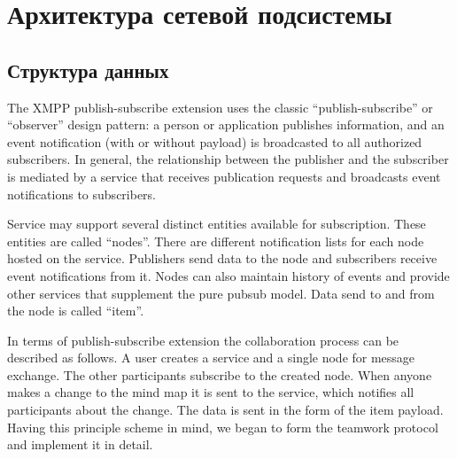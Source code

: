 \section{Архитектура сетевой подсистемы}
\subsection{Структура данных}

The XMPP publish-subscribe extension \cite{xep-0060} uses the classic
``publish-subscribe'' or ``observer'' design pattern: a person or application
publishes information, and an event notification (with or without payload) is
broadcasted to all authorized subscribers. In general, the relationship between
the publisher and the subscriber is mediated by a service that receives
publication requests and broadcasts event notifications to subscribers.


Service may support several distinct entities available for subscription. These
entities are called ``nodes''. There are different notification lists for each
node hosted on the service. Publishers send data to the node and subscribers
receive event notifications from it. Nodes can also maintain history of events
and provide other services that supplement the pure pubsub model. Data send to
and from the node is called ``item''.

In terms of publish-subscribe extension the collaboration process can be
described as follows. A user creates a service and a single node for message
exchange. The other participants subscribe to the created node. When anyone
makes a change to the mind map it is sent to the service, which notifies all
participants about the change. The data is sent in the form of the item
payload. Having this principle scheme in mind, we began to form the teamwork
protocol and implement it in detail.


